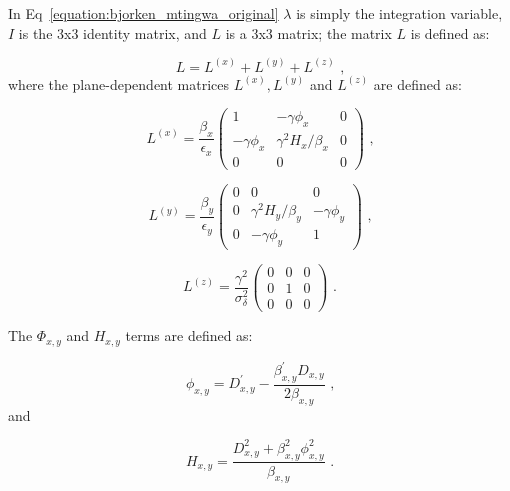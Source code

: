In Eq~\eqref{equation:bjorken_mtingwa_original} \(\lambda\) is simply the integration variable, \(I\) is the 3x3 identity matrix, and \(L\) is a 3x3 matrix; the matrix \(L\) is defined as:

\begin{equation}
    L = L^{(x)} + L^{(y)} + L^{(z)} \text{ ,}
\end{equation}
where the plane-dependent matrices \(L^{(x)}, L^{(y)}\) and \(L^{(z)}\) are defined as:

\begin{equation}
    L^{(x)} = \frac{\beta_x}{\epsilon_x} \left(
        \begin{array}{ccc}
            1              & -\gamma \phi_x         & 0 \\
            -\gamma \phi_x & \gamma^2 H_x / \beta_x & 0 \\
            0              & 0                      & 0
        \end{array} \right) \text{ ,}
\end{equation}

\begin{equation}
    L^{(y)} = \frac{\beta_y}{\epsilon_y} \left(
        \begin{array}{ccc}
            0 & 0                      & 0 \\
            0 & \gamma^2 H_y / \beta_y & -\gamma \phi_y \\
            0 & -\gamma \phi_y         & 1
        \end{array} \right) \text{ ,}
\end{equation}

\begin{equation}
    L^{(z)} = \frac{\gamma^2}{\sigma_\delta^2} \left(
        \begin{array}{lll}
            0 & 0 & 0 \\
            0 & 1 & 0 \\
            0 & 0 & 0
        \end{array} \right) \text{ .}
\end{equation}

The \(\Phi_{x,y}\) and \(H_{x,y}\) terms are defined as:

\begin{equation}
    \phi_{x,y} = D_{x,y}^{\prime} - \frac{\beta_{x,y}^{\prime} D_{x,y}}{2 \beta_{x,y}} \text{ ,}
    \label{equation:bm_phi}
\end{equation}
and

\begin{equation}
    H_{x,y} = \frac{D_{x,y}^2 + \beta_{x,y}^2 \phi_{x,y}^2}{\beta_{x,y}} \text{ .}
    \label{equation:bm_h}
\end{equation}

